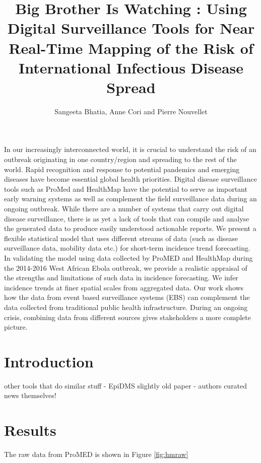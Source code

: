 \documentclass[]{article}
\title{Big Brother Is Watching : Using Digital Surveillance Tools for Near
Real-Time Mapping of the Risk of International Infectious Disease Spread}
\author{Sangeeta Bhatia, Anne Cori and Pierre Nouvellet}
\date{}
\begin{document}
\maketitle

In our increasingly interconnected world, it is crucial to understand
the risk of an outbreak originating in one country/region and spreading
to the rest of the world. Rapid recognition and response to potential
pandemics and emerging diseases have become essential global health
priorities. Digital disease surveillance tools such as ProMed and
HealthMap have the potential to serve as important early warning systems
as well as complement the field surveillance data during an ongoing
outbreak. While there are a number of systems that carry out digital
disease surveillance, there is as yet a lack of tools that can compile
and analyse the generated data to produce easily understood actionable
reports. We present a flexible statistical model that uses different
streams of data (such as disease surveillance data, mobility data etc.)
for short-term incidence trend forecasting.\\
In validating the model using data collected by ProMED and HealthMap
during the 2014-2016 West African Ebola outbreak, we provide a realistic
appraisal of the strengths and limitations of such data in incidence
forecasting. We infer incidence trends at finer spatial scales from
aggregated data. Our work shows how the data from event based
surveillance systems (EBS) can complement the data collected from
traditional public health infrastructure. During an ongoing crisis,
combining data from different sources gives stakeholders a more complete
picture.

\section{Introduction}\label{introduction}

other tools that do similar stuff - EpiDMS \citep{liu2016epidms}
slightly old paper - authors curated news themselves!
\citep{chowell2016elucidating}

\section{Results}\label{results}

The raw data from ProMED is shown in Figure \ref{fig:hmraw}
\end{document}
